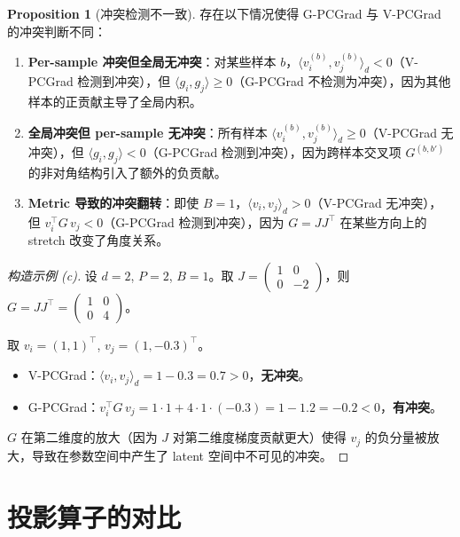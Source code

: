 \documentclass[11pt,a4paper]{article}
\theoremstyle{definition}
\newtheorem{proposition}{Proposition}
\begin{document}
\begin{proposition}[冲突检测不一致]
\label{prop:inconsistency}
存在以下情况使得 G-PCGrad 与 V-PCGrad 的冲突判断不同：

\begin{enumerate}[label=(\alph*)]
\item \textbf{Per-sample 冲突但全局无冲突}：对某些样本 $b$，$\langle v_i^{(b)}, v_j^{(b)}\rangle_d < 0$（V-PCGrad 检测到冲突），但 $\langle g_i, g_j\rangle \geq 0$（G-PCGrad 不检测为冲突），因为其他样本的正贡献主导了全局内积。

\item \textbf{全局冲突但 per-sample 无冲突}：所有样本 $\langle v_i^{(b)}, v_j^{(b)}\rangle_d \geq 0$（V-PCGrad 无冲突），但 $\langle g_i, g_j\rangle < 0$（G-PCGrad 检测到冲突），因为跨样本交叉项 $G^{(b,b')}$ 的非对角结构引入了额外的负贡献。

\item \textbf{Metric 导致的冲突翻转}：即使 $B=1$，$\langle v_i, v_j\rangle_d > 0$（V-PCGrad 无冲突），但 $v_i^\top G\, v_j < 0$（G-PCGrad 检测到冲突），因为 $G = JJ^\top$ 在某些方向上的 stretch 改变了角度关系。
\end{enumerate}
\end{proposition}

\begin{proof}[构造示例 (c)]
设 $d=2$, $P=2$, $B=1$。取 $J = \begin{pmatrix} 1 & 0 \\ 0 & -2 \end{pmatrix}$，则 $G = JJ^\top = \begin{pmatrix} 1 & 0 \\ 0 & 4 \end{pmatrix}$。

取 $v_i = (1, 1)^\top$, $v_j = (1, -0.3)^\top$。
\begin{itemize}
\item V-PCGrad：$\langle v_i, v_j\rangle_d = 1 - 0.3 = 0.7 > 0$，\textbf{无冲突}。
\item G-PCGrad：$v_i^\top G\, v_j = 1\cdot 1 + 4\cdot 1\cdot(-0.3) = 1 - 1.2 = -0.2 < 0$，\textbf{有冲突}。
\end{itemize}

$G$ 在第二维度的放大（因为 $J$ 对第二维度梯度贡献更大）使得 $v_j$ 的负分量被放大，导致在参数空间中产生了 latent 空间中不可见的冲突。
\end{proof}

\section{投影算子的对比}
\label{sec:projection}
\end{document}
